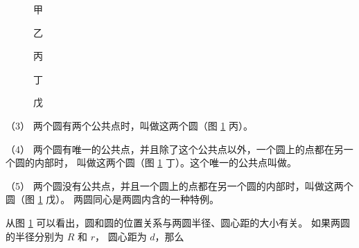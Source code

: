\begin{figure}[htbp]
    \centering
    \begin{minipage}[b]{4.7cm}
        \centering
        
        \caption*{甲}
    \end{minipage}
    \qquad
    \begin{minipage}[b]{4.5cm}
        \centering
        
        \caption*{乙}
    \end{minipage}
    \qquad
    \begin{minipage}[b]{4.5cm}
        \centering
        
        \caption*{丙}
    \end{minipage}
    \qquad
    \begin{minipage}[b]{4.5cm}
        \centering
        
        \caption*{丁}
    \end{minipage}
    \qquad
    \begin{minipage}[b]{7cm}
        \centering
        \begin{minipage}[b]{2.8cm}
            
        \end{minipage}
        \begin{minipage}[b]{2.8cm}
            
        \end{minipage}
        \caption*{戊}
    \end{minipage}
    \caption{}\label{fig:czjh2-7-50}
\end{figure}

（3） 两个圆有两个公共点时，叫做这两个圆（图 \ref{fig:czjh2-7-50} 丙）。

（4） 两个圆有唯一的公共点，并且除了这个公共点以外，一个圆上的点都在另一个圆的内部时，
叫做这两个圆（图 \ref{fig:czjh2-7-50} 丁）。这个唯一的公共点叫做。

（5） 两个圆没有公共点，并且一个圆上的点都在另一个圆的内部时，叫做这两个圆（图 \ref{fig:czjh2-7-50} 戊）。
两圆同心是两圆内含的一种特例。

从图 \ref{fig:czjh2-7-50} 可以看出，圆和圆的位置关系与两圆半径、圆心距的大小有关。
如果两圆的半径分别为 $R$ 和 $r$， 圆心距为 $d$，那么






